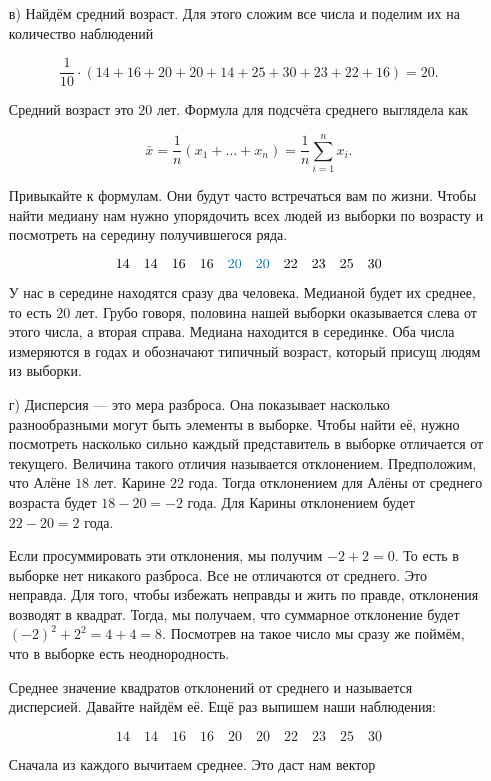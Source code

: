 \documentclass[12pt, a4paper, oneside]{article}
\begin{document}
{\begin{enumerate}
	\item[в)]  Найдём средний возраст. Для этого сложим все числа и поделим их на количество наблюдений
	
	\[
	\frac{1}{10} \cdot (14 + 16 + 20 + 20 + 14 + 25 + 30 + 23 + 22 + 16) = 20.
	\]
	
	Средний возраст это $20$ лет.  Формула для подсчёта среднего выглядела как 
	
	\[
	\bar x = \frac{1}{n} (x_1 + \ldots + x_n) = \frac{1}{n} \sum_{i=1}^n x_i.
	\]
	
	Привыкайте к формулам. Они будут часто встречаться вам по жизни.  Чтобы найти медиану нам нужно упорядочить всех людей из выборки по возрасту и посмотреть на середину получившегося ряда. 
	
	\[
	14 \quad 14  \quad 16  \quad 16  \quad {\color{myblue}{20}}  \quad {\color{myblue}{20}}  \quad 22  \quad 23  \quad 25  \quad 30
	\]
	
	У нас в середине находятся сразу два человека. Медианой будет их среднее, то есть $20$ лет. Грубо говоря, половина нашей выборки оказывается слева от этого числа, а вторая справа. Медиана находится в серединке.  Оба числа измеряются в годах и обозначают типичный возраст, который присущ людям из выборки. 
	

	\item[г)]  Дисперсия --- это мера разброса. Она показывает насколько разнообразными могут быть элементы в выборке. Чтобы найти её, нужно посмотреть насколько сильно каждый представитель в выборке отличается от текущего. Величина такого отличия называется отклонением. Предположим, что Алёне $18$ лет. Карине $22$ года. Тогда отклонением для Алёны от среднего возраста будет $18 - 20 = -2$ года. Для Карины отклонением будет $22 - 20 = 2$ года. 
	
	Если просуммировать эти отклонения, мы получим $-2 + 2 = 0$. То есть в выборке нет никакого разброса. Все не отличаются от среднего. Это неправда. Для того, чтобы избежать неправды и жить по правде, отклонения возводят в квадрат. Тогда, мы получаем, что суммарное отклонение будет $(-2)^2 + 2^2 = 4 + 4 = 8$. Посмотрев на такое число мы сразу же поймём, что в выборке есть неоднородность. 
	
	Среднее значение квадратов отклонений от среднего и называется дисперсией. Давайте найдём её. Ещё раз выпишем наши наблюдения: 
	
	\[
	14 \quad 14  \quad 16  \quad 16  \quad 20  \quad 20  \quad 22  \quad 23  \quad 25  \quad 30
	\]
	
	Сначала из каждого вычитаем среднее. Это даст нам вектор 
	

\end{enumerate}}
\end{document}
